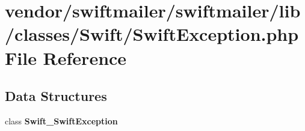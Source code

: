 \section{vendor/swiftmailer/swiftmailer/lib/classes/\+Swift/\+Swift\+Exception.php File Reference}
\label{_swift_exception_8php}
\subsection*{Data Structures}
\begin{DoxyCompactItemize}
\item 
class {\bf Swift\+\_\+\+Swift\+Exception}
\end{DoxyCompactItemize}
